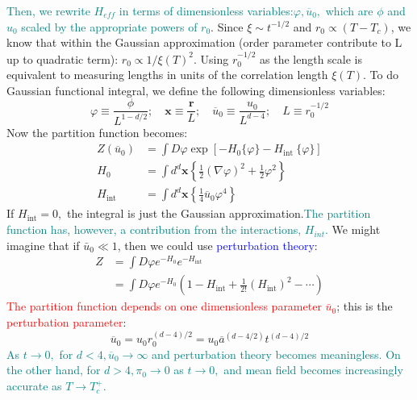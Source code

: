 \documentclass[12pt,titlepage]{article}
\newcommand{\redp}[1]{\textcolor{red}{#1}}
\newcommand{\bluep}[1]{\textcolor{blue}{#1}}
\newcommand{\tealp}[1]{\textcolor{teal}{#1}}
\numberwithin{equation}{section}
\begin{document}
\tealp{Then, we rewrite $H_{eff}$ in terms of dimensionless variables:$\varphi, \overline{u}_{0},$ which are $\phi$ and $u_0$ scaled by the appropriate powers of $r_0$}. Since $\xi\sim t^{-1/2}$ and $r_0\propto (T-T_c)$, we know that within the Gaussian approximation (order parameter contribute to L up to quadratic term): $r_{0} \propto 1 / \xi(T)^{2} .$ Using $r_{0}^{-1 / 2}$ as the length scale is equivalent to measuring lengths in units of the correlation length $\xi(T)$. To do Gaussian functional integral, we define the following dimensionless variables:
\begin{equation}
\varphi \equiv \frac{\phi}{L^{1-d / 2}} ; \quad \mathbf{x} \equiv \frac{\mathbf{r}}{L} ; \quad \overline{u}_{0} \equiv \frac{u_{0}}{L^{d-4}} ; \quad L \equiv r_{0}^{-1 / 2}
\end{equation}
Now the partition function becomes:
\begin{equation}
\begin{aligned} Z\left(\overline{u}_{0}\right) &=\int D \varphi \exp \left[-H_{0}\{\varphi\}-H_{\text {int }}\{\varphi\}\right] \\ H_{0} &=\int d^{d} \mathbf{x}\left\{\frac{1}{2}(\nabla \varphi)^{2}+\frac{1}{2} \varphi^{2}\right\} \\ H_{\text {int }} &=\int d^{d} \mathbf{x}\left\{\frac{1}{4} \overline{u}_{0} \varphi^{4}\right\} \end{aligned}
\end{equation}
If $H_{\mathrm{int}}=0,$ the integral is just the Gaussian approximation.\tealp{The partition function has, however, a contribution from the interactions, $H_{int}$.} We might imagine that if $\bar u_0 \ll 1$, then we could use \bluep{perturbation theory}:
\begin{equation}
\begin{aligned} Z &=\int D \varphi e^{-H_{0}} e^{-H_{\mathrm{int}}} \\ &=\int D \varphi e^{-H_{0}}\left(1-H_{\mathrm{int}}+\frac{1}{2 !}\left(H_{\mathrm{int}}\right)^{2}-\cdots\right) \end{aligned}
\end{equation}
\redp{The partition function depends on one dimensionless parameter $\bar u_0$}; this is the \redp{perturbation parameter}:
\begin{equation}
\overline{u}_{0}=u_{0} r_{0}^{(d-4) / 2}=u_{0} \overline{a}^{(d-4 / 2)} t^{(d-4) / 2}
\label{u_0_bar}
\end{equation}
\tealp{As $t \rightarrow 0,$ for $d<4, \overline{u}_{0} \rightarrow \infty$ and perturbation theory becomes meaningless. On the other hand, for $d>4, \pi_{0} \rightarrow 0$ as $t \rightarrow 0,$ and mean field becomes increasingly accurate as $T \rightarrow T_{c}^{+}$.}
\end{document}

